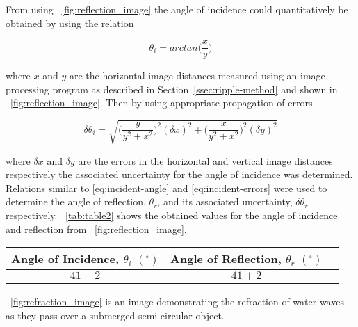 \documentclass{article}
\newcommand{\figref}[2][\figurename~]{#1\ref{#2}}
\newcommand{\tabref}[2][\tablename~]{#1\ref{#2}}
\newcommand{\secref}[2][Section~]{#1\ref{#2}}
\begin{document}
\vspace{2mm}
\noindent
From using \figref{fig:reflection_image} the angle of incidence could quantitatively be obtained by using the relation

\begin{equation}
\label{eq:incident-angle}
\theta_i = arctan\bigg(\frac{x}{y}\bigg)
\end{equation}

\vspace{2mm}
\noindent
where $x$ and $y$ are the horizontal image distances measured using an image processing program as described in \secref{ssec:ripple-method} and shown in \figref{fig:reflection_image}. Then by using appropriate propagation of errors

\begin{equation}
\label{eq:incident-errors}
\delta \theta_i = \sqrt{\bigg(\frac{y}{y^2 + x^2}\bigg)^2(\delta x)^2 + \bigg(\frac{x}{y^2 + x^2}\bigg)^2(\delta y)^2}
\end{equation}

\vspace{2mm}
\noindent
where $\delta x$ and $\delta y$ are the errors in the horizontal and vertical image distances respectively the associated uncertainty for the angle of incidence was determined. Relations similar to \eqref{eq:incident-angle} and \eqref{eq:incident-errors} were used to determine the angle of reflection, $\theta_r$, and its associated uncertainty, $\delta \theta_r$ respectively. \tabref{tab:table2} shows the obtained values for the angle of incidence and reflection from \figref{fig:reflection_image}.

\vspace{5mm}
\begin{table*}[h]
\centering %
\caption{Table of values for the angle of incidence and reflection for water waves at 20 Hz shown in \figref{fig:reflection_image}.}
\label{tab:table2}
\begin{tabular}{|c|c|c|}
\hline
Angle of Incidence, $\theta_i$ $(^{\circ})$ & Angle of Reflection, $\theta_r$ $(^{\circ})$ \\
\hline
$41 \pm 2$ & $41 \pm 2$ \\
\hline
\end{tabular}
\end{table*}


\vspace{2mm}
\noindent
\figref{fig:refraction_image} is an image demonstrating the refraction of water waves as they pass over a submerged semi-circular object.
\end{document}
